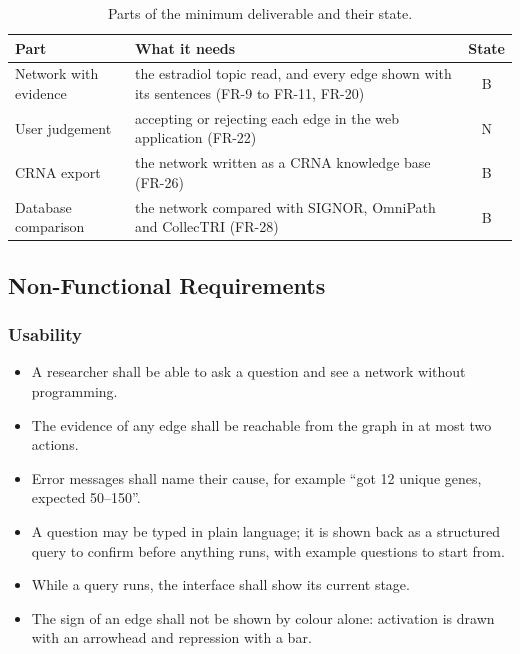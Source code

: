 \documentclass[11pt,a4paper]{article}
\begin{document}
\begin{table}[htbp]
\centering
\small
\begin{tabularx}{\textwidth}{@{}lLc@{}}
\toprule
\textbf{Part} & \textbf{What it needs} & \textbf{State}\\
\midrule
Network with evidence & the estradiol topic read, and every edge shown with its sentences
  (FR-9 to FR-11, FR-20) & B\\
User judgement & accepting or rejecting each edge in the web application (FR-22) & N\\
CRNA export & the network written as a CRNA knowledge base (FR-26) & B\\
Database comparison & the network compared with SIGNOR, OmniPath and CollecTRI (FR-28) & B\\
\bottomrule
\end{tabularx}
\caption{Parts of the minimum deliverable and their state.}
\label{tab:deliverable}
\end{table}

\subsection{Non-Functional Requirements}

\subsubsection{Usability}
\begin{itemize}
  \item A researcher shall be able to ask a question and see a network without programming.
  \item The evidence of any edge shall be reachable from the graph in at most two actions.
  \item Error messages shall name their cause, for example ``got 12 unique genes, expected
    50--150''.
  \item A question may be typed in plain language; it is shown back as a structured query to
    confirm before anything runs, with example questions to start from.
  \item While a query runs, the interface shall show its current stage.
  \item The sign of an edge shall not be shown by colour alone: activation is drawn with an
    arrowhead and repression with a bar.
\end{itemize}

\end{document}
